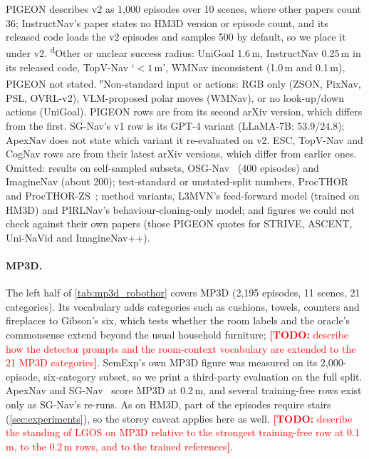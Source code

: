 \documentclass[10pt]{article}
\newcommand{\TODO}[1]{\textcolor{red}{\textbf{[TODO:} #1\textbf{]}}}
\newcommand{\ours}{LGOS\xspace}
\begin{document}
\begin{table}[tp]
{PIGEON describes v2 as 1{,}000 episodes over 10 scenes, where other papers count 36; InstructNav's paper states no
HM3D version or episode count, and its released code loads the v2 episodes and samples 500 by default, so we place it
under v2. \textsuperscript{d}Other or unclear success radius: UniGoal 1.6\,m, InstructNav 0.25\,m in its released
code, TopV-Nav `$<1$\,m', WMNav inconsistent (1.0\,m and 0.1\,m), PIGEON not stated. \textsuperscript{e}Non-standard
input or actions: RGB only (ZSON, PixNav, PSL, OVRL-v2), VLM-proposed polar moves (WMNav), or no look-up/down actions
(UniGoal). PIGEON rows are from its second arXiv version, which differs from the first. SG-Nav's v1 row is its GPT-4 variant (LLaMA-7B: 53.9/24.8); ApexNav does not
state which variant it re-evaluated on v2. ESC, TopV-Nav and CogNav rows are from their latest arXiv versions, which
differ from earlier ones. Omitted: results on self-sampled subsets, OSG-Nav~\citep{loo2025open} (400 episodes) and
ImagineNav (about 200); test-standard or unstated-split numbers, ProcTHOR and ProcTHOR-ZS~\citep{deitke2022procthor};
method variants, L3MVN's feed-forward model (trained on HM3D) and PIRLNav's behaviour-cloning-only model; and figures
we could not check against their own papers (those PIGEON quotes for STRIVE, ASCENT, Uni-NaVid and ImagineNav++).}
\end{table}

\paragraph{MP3D.}
The left half of \cref{tab:mp3d_robothor} covers MP3D (2{,}195 episodes, 11 scenes, 21 categories). Its vocabulary
adds categories such as cushions, towels, counters and fireplaces to Gibson's six, which tests whether the room
labels and the oracle's commonsense extend beyond the usual household furniture; \TODO{describe how the detector
prompts and the room-context vocabulary are extended to the 21 MP3D categories}. SemExp's own MP3D figure was
measured on its 2{,}000-episode, six-category subset, so we print a third-party evaluation on the full split.
ApexNav and SG-Nav~\citep{yin2024sg} score MP3D at 0.2\,m, and several training-free rows exist only as SG-Nav's
re-runs. As on HM3D, part of the episodes require stairs (\cref{sec:experiments}), so the storey caveat applies here
as well. \TODO{describe the standing
of \ours on MP3D relative to the strongest training-free row at 0.1\,m, to the 0.2\,m rows, and to the trained
references}.
\end{document}
